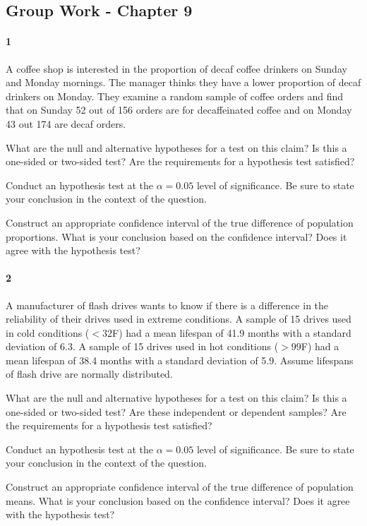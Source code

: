 \documentclass{article}
\begin{document}
\begin{flushleft}
\section*{Group Work - Chapter 9}
\paragraph{1} A coffee shop is interested in the proportion of decaf coffee drinkers on Sunday and Monday mornings. The manager thinks they have a lower proportion of decaf drinkers on Monday. They examine a random sample of coffee orders and find that on Sunday 52 out of 156 orders are for decaffeinated coffee and on Monday 43 out 174 are decaf orders.
\begin{enumalpha}
\item What are the null and alternative hypotheses for a test on this claim? Is this a one-sided or two-sided test? Are the requirements for a hypothesis test satisfied?
\vspace{2.25in}
\item Conduct an hypothesis test at the $\alpha = 0.05$ level of significance. Be sure to state your conclusion in the context of the question.
\vspace{2.25in}
\item Construct an appropriate confidence interval of the true difference of population proportions. What is your conclusion based on the confidence interval? Does it agree with the hypothesis test?
\end{enumalpha}



\newpage
\paragraph{2} A manufacturer of flash drives wants to know if there is a difference in the reliability of their drives used in extreme conditions. A sample of 15 drives used in cold conditions ($< 32 $\textdegree F) had a mean lifespan of 41.9 months with a standard deviation of 6.3. A sample of 15 drives used in hot conditions ($> 99 $\textdegree F) had a mean lifespan of 38.4 months with a standard deviation of 5.9. Assume lifespans of flash drive are normally distributed.
\begin{enumalpha}
\item What are the null and alternative hypotheses for a test on this claim? Is this a one-sided or two-sided test? Are these independent or dependent samples? Are the requirements for a hypothesis test satisfied?
\vspace{2.25in}
\item Conduct an hypothesis test at the $\alpha = 0.05$ level of significance. Be sure to state your conclusion in the context of the question.
\vspace{2.25in}
\item Construct an appropriate confidence interval of the true difference of population means. What is your conclusion based on the confidence interval? Does it agree with the hypothesis test?
\end{enumalpha}


\end{flushleft}
\end{document}

